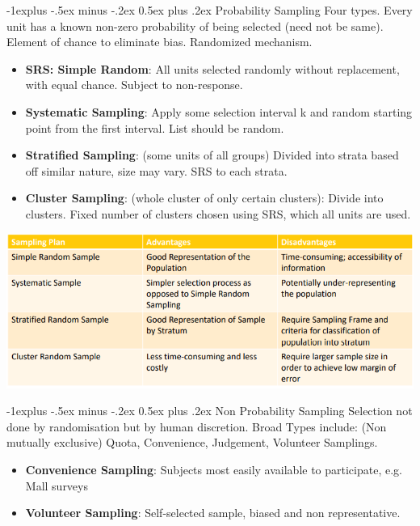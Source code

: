 \documentclass[10pt, landscape]{article}
\makeatletter
\renewcommand{\subsection}{\@startsection{subsection}{2}{0mm}%
                                {-1explus -.5ex minus -.2ex}%
                                {0.5ex plus .2ex}%
                                {\normalfont\normalsize\bfseries}}
\makeatother
\begin{document}
\begin{multicols*}{3}
\subsection{Probability Sampling}
	Four types. Every unit has a known non-zero probability of being selected (need not be same). Element of chance to eliminate bias. Randomized mechanism.
\begin{itemize}
	\item \textbf{SRS: Simple Random}: All units selected randomly without replacement, with equal chance. Subject to non-response.
	\item \textbf{Systematic Sampling}: Apply some selection interval k and random starting point from the first interval. List should be random.
	\item \textbf{Stratified Sampling}: (some units of all groups) Divided into strata based off similar nature, size may vary. SRS to each strata.
	\item \textbf{Cluster Sampling}: (whole cluster of only certain clusters): Divide into clusters. Fixed number of clusters chosen using SRS, which all units are used.
\end{itemize}
\includegraphics[width = \linewidth]{samplingPlans}

\subsection{Non Probability Sampling}
	Selection not done by randomisation but by human discretion. Broad Types include: (Non mutually exclusive) Quota, Convenience, Judgement, Volunteer Samplings.
\begin{itemize}
	\item \textbf{Convenience Sampling}: Subjects most easily available to participate, e.g. Mall surveys
	\item \textbf{Volunteer Sampling}: Self-selected sample, biased and non representative.
\end{itemize}


\end{multicols*}
\end{document}
